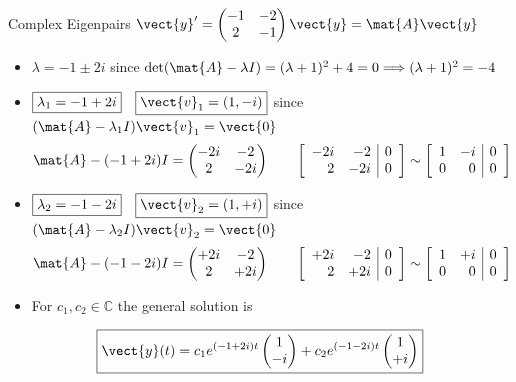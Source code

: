 \begin{frame}{Complex Eigenpairs \qquad $\vect{y}'=\begin{pmatrix}-1&-2\\2&-1\end{pmatrix}\vect{y}=\mat{A}\vect{y}$}
	\begin{itemize}
		\item $\boxed{\lambda=-1\pm2i}$ since
		$\det(\mat{A}-\lambda I)=(\lambda+1)^2+4=0
		 \Longrightarrow (\lambda+1)^2=-4$ 
		 \item $\boxed{\lambda_1=-1+2i}\quad\boxed{\vect{v}_1= (1,-i)}$ since 
		 $(\mat{A}-\lambda_1 I)\vect{v}_1=\vect{0}$
		 \[
		 \mat{A}-(-1+2i)I=\begin{pmatrix}-2i&-2\\2&-2i\end{pmatrix}
		 \qquad
		 \left[\begin{array}{rr|r}-2i&-2&0\\2&-2i&0\end{array}\right]
		 \sim
		 \left[\begin{array}{rr|r}1&-i&0\\0&0&0\end{array}\right]
		 \]
		 \item $\boxed{\lambda_2=-1-2i}\quad\boxed{\vect{v}_2= (1,+i)}$ since 
		 $(\mat{A}-\lambda_2 I)\vect{v}_2=\vect{0}$
		 \[
		 \mat{A}-(-1-2i)I=\begin{pmatrix}+2i&-2\\2&+2i\end{pmatrix}
		 \qquad
		 \left[\begin{array}{rr|r}+2i&-2&0\\2&+2i&0\end{array}\right]
		 \sim
		 \left[\begin{array}{rr|r}1&+i&0\\0&0&0\end{array}\right]
		 \]
\item For $c_1,c_2\in\mathbb{C}$ the general solution is 
\end{itemize}
\[
  \boxed{\vect{y}(t)=c_1e^{(-1+2i)t}\begin{pmatrix}1\\-i\end{pmatrix}
    +c_2e^{(-1-2i)t}\begin{pmatrix}1\\+i\end{pmatrix}}
\]
\end{frame}

